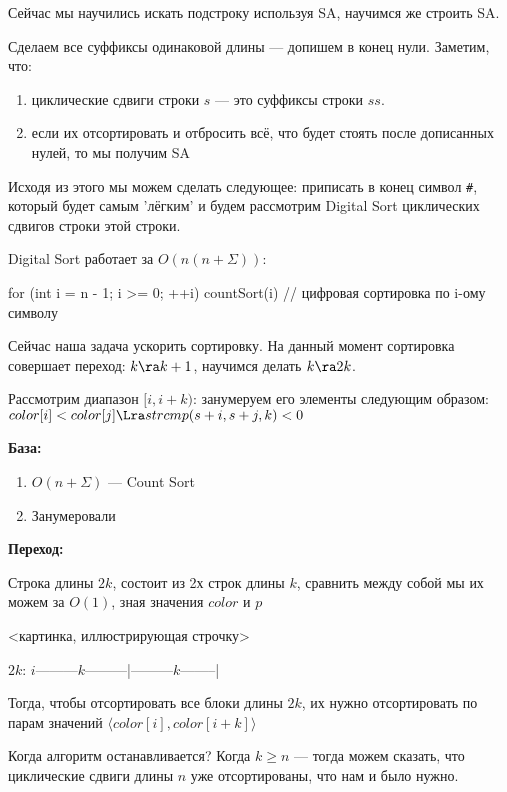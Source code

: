 Сейчас мы научились искать подстроку используя SA, научимся же строить SA.

Сделаем все суффиксы одинаковой длины --- допишем в конец нули. Заметим, что:
\begin{enumerate}
	\item циклические сдвиги строки $s$ --- это суффиксы строки $ss$.
	\item если их отсортировать и отбросить всё, что будет стоять после дописанных нулей, то мы получим SA
\end{enumerate}

Исходя из этого мы можем сделать следующее: приписать в конец символ \texttt{\#}, который будет самым 'лёгким'  и 
будем рассмотрим Digital Sort циклических сдвигов строки этой строки. 

Digital Sort работает за $O(n(n + \Sigma))$:
\begin{cppcode}
	for (int i = n - 1; i >= 0; ++i)
		countSort(i) // цифровая сортировка по i-ому символу
\end{cppcode}
	
Сейчас наша задача ускорить сортировку. На данный момент сортировка совершает переход: $k \ra k + 1$,  научимся делать $k \ra 2k$.
	
Рассмотрим диапазон $[i, i + k)$:	занумеруем его элементы следующим образом: $color[i] < color[j] \Lra strcmp(s + i, s + j,  k) < 0$
	
\textbf{База:}

\begin{enumerate}
	\item $O(n + \Sigma)$ --- Count Sort
	\item Занумеровали
\end{enumerate}
	
\textbf{Переход:}

	Строка длины 	$2k$, состоит из 2х строк длины $k$, сравнить между собой мы их можем за $O(1)$, зная значения $color$ и $p$
	
	<картинка, иллюстрирующая строчку>
	
	$2k$: $i$---------$k$---------|---------$k$--------|
	
	Тогда, чтобы отсортировать все блоки длины $2k$, их нужно отсортировать по парам значений $\langle color[i], color[i + k] \rangle$
	
	Когда алгоритм останавливается? Когда $k \geq n$ --- тогда можем сказать, что циклические сдвиги длины $n$ уже отсортированы, что нам и было нужно.


